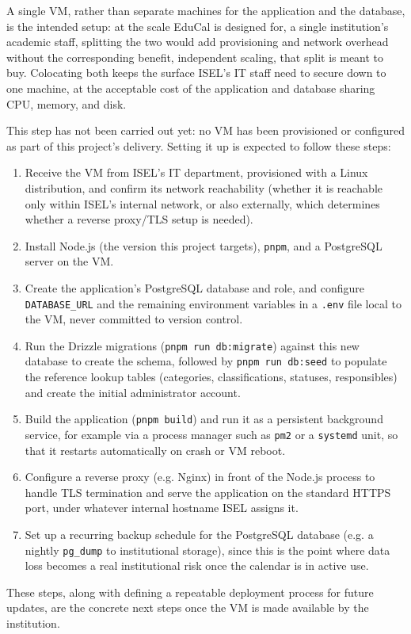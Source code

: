 A single VM, rather than separate machines for the application and the database, is the intended setup: at the scale EduCal is designed for, a single institution's academic staff, splitting the two would add provisioning and network overhead without the corresponding benefit, independent scaling, that split is meant to buy. Colocating both keeps the surface ISEL's IT staff need to secure down to one machine, at the acceptable cost of the application and database sharing CPU, memory, and disk.

This step has not been carried out yet: no VM has been provisioned or configured as part of this project's delivery. Setting it up is expected to follow these steps:

\begin{enumerate}
    \item Receive the VM from ISEL's IT department, provisioned with a Linux distribution, and confirm its network reachability (whether it is reachable only within ISEL's internal network, or also externally, which determines whether a reverse proxy/TLS setup is needed).
    \item Install Node.js (the version this project targets), \texttt{pnpm}, and a PostgreSQL server on the VM.
    \item Create the application's PostgreSQL database and role, and configure \texttt{DATABASE\_URL} and the remaining environment variables in a \texttt{.env} file local to the VM, never committed to version control.
    \item Run the Drizzle migrations (\texttt{pnpm run db:migrate}) against this new database to create the schema, followed by \texttt{pnpm run db:seed} to populate the reference lookup tables (categories, classifications, statuses, responsibles) and create the initial administrator account.
    \item Build the application (\texttt{pnpm build}) and run it as a persistent background service, for example via a process manager such as \texttt{pm2} or a \texttt{systemd} unit, so that it restarts automatically on crash or VM reboot.
    \item Configure a reverse proxy (e.g. Nginx) in front of the Node.js process to handle TLS termination and serve the application on the standard HTTPS port, under whatever internal hostname ISEL assigns it.
    \item Set up a recurring backup schedule for the PostgreSQL database (e.g. a nightly \texttt{pg\_dump} to institutional storage), since this is the point where data loss becomes a real institutional risk once the calendar is in active use.
\end{enumerate}

These steps, along with defining a repeatable deployment process for future updates, are the concrete next steps once the VM is made available by the institution.
